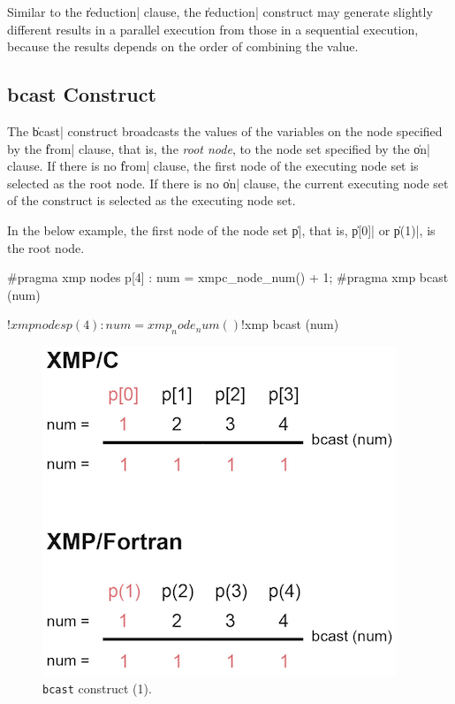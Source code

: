 \begin{mynote}
  Similar to the \|reduction| clause, the \|reduction| construct may
  generate slightly different results in a parallel execution from those
  in a sequential execution, because the results depends on the order of
  combining the value.
\end{mynote}


\subsection{{\bf bcast} Construct}

The \|bcast| construct broadcasts the values of the variables on the
node specified by the \|from| clause, that is, the {\it root node}, to
the node set specified by the \|on| clause.
%
If there is no \|from| clause, the first node of the executing node
set is selected as the root node.
%
If there is no \|on| clause, the current executing node set of the
construct is selected as the executing node set.

In the below example, the first node of the node set \|p|, that is,
\|p[0]| or \|p(1)|, is the root node.

\begin{XCexample}
#pragma xmp nodes p[4]
  :
num = xmpc_node_num() + 1;
#pragma xmp bcast (num)
\end{XCexample}

\begin{XFexample}
!$xmp nodes p(4)
  :
num = xmp_node_num()
!$xmp bcast (num)
\end{XFexample}

\begin{figure}
  \centering
  \includegraphics{figs/bcast.png}
  \caption{{\tt bcast} construct (1).}
\end{figure}

